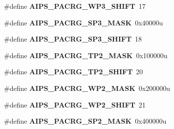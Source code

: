 \begin{DoxyCompactItemize}
\item 
\#define {\bfseries A\+I\+P\+S\+\_\+\+P\+A\+C\+R\+G\+\_\+\+W\+P3\+\_\+\+S\+H\+I\+FT}~17\hypertarget{group__AIPS__Register__Masks_ga512231b18e005e314b909698d27a6fdb}{}\label{group__AIPS__Register__Masks_ga512231b18e005e314b909698d27a6fdb}

\item 
\#define {\bfseries A\+I\+P\+S\+\_\+\+P\+A\+C\+R\+G\+\_\+\+S\+P3\+\_\+\+M\+A\+SK}~0x40000u\hypertarget{group__AIPS__Register__Masks_ga40dba10c660daa7b76a65fadea191536}{}\label{group__AIPS__Register__Masks_ga40dba10c660daa7b76a65fadea191536}

\item 
\#define {\bfseries A\+I\+P\+S\+\_\+\+P\+A\+C\+R\+G\+\_\+\+S\+P3\+\_\+\+S\+H\+I\+FT}~18\hypertarget{group__AIPS__Register__Masks_ga07d1409612cedfce72fe208ea5620577}{}\label{group__AIPS__Register__Masks_ga07d1409612cedfce72fe208ea5620577}

\item 
\#define {\bfseries A\+I\+P\+S\+\_\+\+P\+A\+C\+R\+G\+\_\+\+T\+P2\+\_\+\+M\+A\+SK}~0x100000u\hypertarget{group__AIPS__Register__Masks_ga13c9ec7cf11fb793b6db181633887de5}{}\label{group__AIPS__Register__Masks_ga13c9ec7cf11fb793b6db181633887de5}

\item 
\#define {\bfseries A\+I\+P\+S\+\_\+\+P\+A\+C\+R\+G\+\_\+\+T\+P2\+\_\+\+S\+H\+I\+FT}~20\hypertarget{group__AIPS__Register__Masks_ga5c4d9abf6bcc1b640ac7b4776bd4084a}{}\label{group__AIPS__Register__Masks_ga5c4d9abf6bcc1b640ac7b4776bd4084a}

\item 
\#define {\bfseries A\+I\+P\+S\+\_\+\+P\+A\+C\+R\+G\+\_\+\+W\+P2\+\_\+\+M\+A\+SK}~0x200000u\hypertarget{group__AIPS__Register__Masks_ga987a7de6bc9f4e3da4225d628ba97b49}{}\label{group__AIPS__Register__Masks_ga987a7de6bc9f4e3da4225d628ba97b49}

\item 
\#define {\bfseries A\+I\+P\+S\+\_\+\+P\+A\+C\+R\+G\+\_\+\+W\+P2\+\_\+\+S\+H\+I\+FT}~21\hypertarget{group__AIPS__Register__Masks_ga41b3a2977ec0b20fd1216cfe73198a13}{}\label{group__AIPS__Register__Masks_ga41b3a2977ec0b20fd1216cfe73198a13}

\item 
\#define {\bfseries A\+I\+P\+S\+\_\+\+P\+A\+C\+R\+G\+\_\+\+S\+P2\+\_\+\+M\+A\+SK}~0x400000u\hypertarget{group__AIPS__Register__Masks_ga3a1ef38d40b35bb74bbbdcf2dc307d2f}{}\label{group__AIPS__Register__Masks_ga3a1ef38d40b35bb74bbbdcf2dc307d2f}


\end{DoxyCompactItemize}
